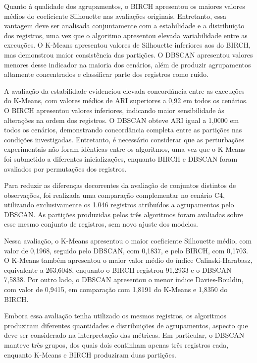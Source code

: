 \documentclass[lettersize,journal]{IEEEtran}
\begin{document}
Quanto à qualidade dos agrupamentos, o BIRCH apresentou os maiores valores médios do coeficiente Silhouette nas avaliações originais. Entretanto, essa vantagem deve ser analisada conjuntamente com a estabilidade e a distribuição dos registros, uma vez que o algoritmo apresentou elevada variabilidade entre as execuções. O K-Means apresentou valores de Silhouette inferiores aos do BIRCH, mas demonstrou maior consistência das partições. O DBSCAN apresentou valores menores desse indicador na maioria dos cenários, além de produzir agrupamentos altamente concentrados e classificar parte dos registros como ruído.

A avaliação da estabilidade evidenciou elevada concordância entre as execuções do K-Means, com valores médios de ARI superiores a 0,92 em todos os cenários. O BIRCH apresentou valores inferiores, indicando maior sensibilidade às alterações na ordem dos registros. O DBSCAN obteve ARI igual a 1,0000 em todos os cenários, demonstrando concordância completa entre as partições nas condições investigadas. Entretanto, é necessário considerar que as perturbações experimentais não foram idênticas entre os algoritmos, uma vez que o K-Means foi submetido a diferentes inicializações, enquanto BIRCH e DBSCAN foram avaliados por permutações dos registros.

Para reduzir as diferenças decorrentes da avaliação de conjuntos distintos de observações, foi realizada uma comparação complementar no cenário C4, utilizando exclusivamente os 1.046 registros atribuídos a agrupamentos pelo DBSCAN. As partições produzidas pelos três algoritmos foram avaliadas sobre esse mesmo conjunto de registros, sem novo ajuste dos modelos.

Nessa avaliação, o K-Means apresentou o maior coeficiente Silhouette médio, com valor de 0,1968, seguido pelo DBSCAN, com 0,1837, e pelo BIRCH, com 0,1703. O K-Means também apresentou o maior valor médio do índice Calinski-Harabasz, equivalente a 263,6048, enquanto o BIRCH registrou 91,2933 e o DBSCAN 7,5838. Por outro lado, o DBSCAN apresentou o menor índice Davies-Bouldin, com valor de 0,9415, em comparação com 1,8191 do K-Means e 1,8350 do BIRCH.

Embora essa avaliação tenha utilizado os mesmos registros, os algoritmos produziram diferentes quantidades e distribuições de agrupamentos, aspecto que deve ser considerado na interpretação das métricas. Em particular, o DBSCAN manteve três grupos, dos quais dois continham apenas três registros cada, enquanto K-Means e BIRCH produziram duas partições.
\end{document}
